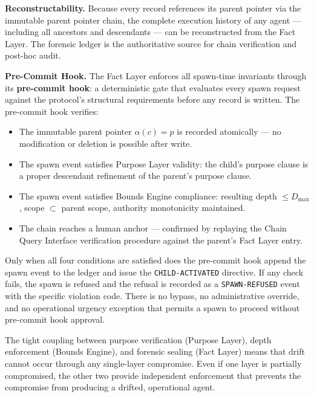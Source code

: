 \bigskip
\noindent\textbf{Reconstructability.} Because every record references its parent pointer via the immutable parent pointer chain, the complete execution history of any agent — including all ancestors and descendants — can be reconstructed from the Fact Layer. The forensic ledger is the authoritative source for chain verification and post-hoc audit.

\bigskip
\noindent\textbf{Pre-Commit Hook.}
The Fact Layer enforces all spawn-time invariants through its \textbf{pre-commit hook}: a deterministic gate that evaluates every spawn request against the protocol's structural requirements before any record is written. The pre-commit hook verifies:

\begin{itemize}
  \item[(PH-C1)] The immutable parent pointer $\alpha(c) = p$ is recorded atomically — no modification or deletion is possible after write.
  \item[(PH-C2)] The spawn event satisfies Purpose Layer validity: the child's purpose clause is a proper descendant refinement of the parent's purpose clause.
  \item[(PH-C3)] The spawn event satisfies Bounds Engine compliance: resulting depth $\leq D_{\max}$, scope $\subset$ parent scope, authority monotonicity maintained.
  \item[(PH-C4)] The chain reaches a human anchor — confirmed by replaying the Chain Query Interface verification procedure against the parent's Fact Layer entry.
\end{itemize}

Only when all four conditions are satisfied does the pre-commit hook append the spawn event to the ledger and issue the \texttt{CHILD-ACTIVATED} directive. If any check fails, the spawn is refused and the refusal is recorded as a \texttt{SPAWN-REFUSED} event with the specific violation code. There is no bypass, no administrative override, and no operational urgency exception that permits a spawn to proceed without pre-commit hook approval.

The tight coupling between purpose verification (Purpose Layer), depth enforcement (Bounds Engine), and forensic sealing (Fact Layer) means that drift cannot occur through any single-layer compromise. Even if one layer is partially compromised, the other two provide independent enforcement that prevents the compromise from producing a drifted, operational agent.

